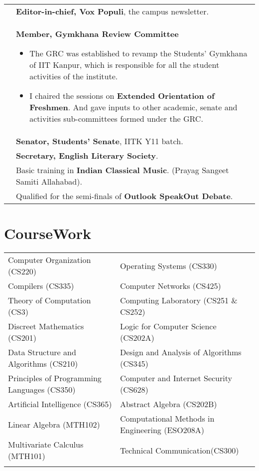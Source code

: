 \documentclass[a4paper,10pt]{article} %
\begin{document}
\begin{tabular}{>{\raggedleft}p{2.2cm}p{15cm}}
    2013 & \textbf{Editor-in-chief, Vox Populi}, the campus newsletter. \\

    2012 & \textbf{Member, Gymkhana Review Committee}
           \footnotesize{
               \begin{itemize}[leftmargin=*]
                   \item The GRC was established to revamp the Students' Gymkhana of IIT Kanpur,
                       which is responsible for all the student activities of the institute.
                   \item I chaired the sessions on \textbf{Extended Orientation of Freshmen}.
                       And gave inputs to other academic, senate and activities sub-committees formed under the GRC.
               \end{itemize}
           }\\

    2012 & \textbf{Senator, Students' Senate}, IITK Y11 batch. \\

    2012 & \textbf{Secretary, English Literary Society}. \\

    2010 & Basic training in \textbf{Indian Classical Music}. (Prayag Sangeet Samiti Allahabad). \\

    2009 & Qualified for the semi-finals of \textbf{Outlook SpeakOut Debate}. \\

\end{tabular}

\section{CourseWork}

\begin{tabular}{>{\raggedleft}p{8cm}|p{8cm}}

    Computer Organization (CS220) & Operating Systems (CS330) \\
    Compilers (CS335) & Computer Networks (CS425) \\
    Theory of Computation (CS3) & Computing Laboratory (CS251 \& CS252)\\
    Discreet Mathematics (CS201) & Logic for Computer Science (CS202A)\\
    Data Structure and Algorithms (CS210) & Design and Analysis of Algorithms (CS345)\\
    Principles of Programming Languages (CS350) & Computer and Internet Security (CS628)\\
    Artificial Intelligence (CS365) & Abstract Algebra (CS202B)\\
    Linear Algebra (MTH102) & Computational Methods in Engineering (ESO208A)\\
    Multivariate Calculus (MTH101) & Technical Communication(CS300)\\
                     \\
\end{tabular}
\end{document}
